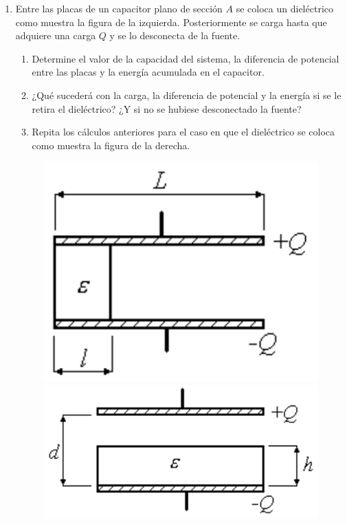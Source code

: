 \documentclass[11pt,spanish,a4paper]{article}
\begin{document}
\begin{enumerate}
\item Entre las placas de un capacitor plano de sección \(A\) se coloca un dieléctrico como muestra la figura de la izquierda.
Posteriormente se carga hasta que adquiere una carga \(Q\) y se lo desconecta de la fuente.
\begin{enumerate}
  \item Determine el valor de la capacidad del sistema, la diferencia de potencial entre las placas y la energía acumulada en el capacitor.
  \item ¿Qué sucederá con la carga, la diferencia de potencial y la energía si se le retira el dieléctrico? ¿Y si no se hubiese desconectado la fuente?
  \item Repita los cálculos anteriores para el caso en que el dieléctrico se coloca como muestra la figura de la derecha.
\end{enumerate}
\vspace{-1cm}
\begin{figure}[H]
  \centering{}\includegraphics[height= 0.2\textwidth]{p2e09a}
  \centering{}\includegraphics[height= 0.15\textwidth]{p2e09b}
\end{figure}



\end{enumerate}
\end{document}
